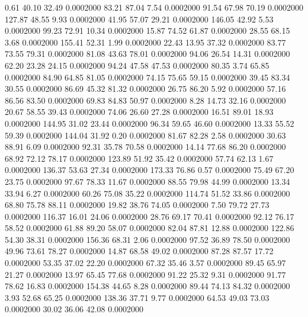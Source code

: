    0.61   40.10   32.49   0.0002000
  83.21   87.04    7.54   0.0002000
  91.54   67.98   70.19   0.0002000
 127.87   48.55    9.93   0.0002000
  41.95   57.07   29.21   0.0002000
 146.05   42.92    5.53   0.0002000
  99.23   72.91   10.34   0.0002000
  15.87   74.52   61.87   0.0002000
  28.55   68.15    3.68   0.0002000
 155.41   52.31    1.99   0.0002000
  22.43   13.95   37.32   0.0002000
  83.77   73.55   79.31   0.0002000
  81.08   43.63   78.01   0.0002000
  94.06   26.54   14.31   0.0002000
  62.20   23.28   24.15   0.0002000
  94.24   47.58   47.53   0.0002000
  80.35    3.74   65.85   0.0002000
  84.90   64.85   81.05   0.0002000
  74.15   75.65   59.15   0.0002000
  39.45   83.34   30.55   0.0002000
  86.69   45.32   81.32   0.0002000
  26.75   86.20    5.92   0.0002000
  57.16   86.56   83.50   0.0002000
  69.83   84.83   50.97   0.0002000
   8.28   14.73   32.16   0.0002000
  20.67   58.55   39.43   0.0002000
  74.06   26.60   27.28   0.0002000
  16.51   89.01   18.93   0.0002000
 144.95   31.02   23.44   0.0002000
  96.34   59.65   46.60   0.0002000
  13.33   55.52   59.39   0.0002000
 144.04   31.92    0.20   0.0002000
  81.67   82.28    2.58   0.0002000
  30.63   88.91    6.09   0.0002000
  92.31   35.78   70.58   0.0002000
  14.14   77.68   86.20   0.0002000
  68.92   72.12   78.17   0.0002000
 123.89   51.92   35.42   0.0002000
  57.74   62.13    1.67   0.0002000
 136.37   53.63   27.34   0.0002000
 173.33   76.86    0.57   0.0002000
  75.49   67.20   23.75   0.0002000
  97.67   78.33   11.67   0.0002000
  88.55   79.98   44.99   0.0002000
  13.34   33.94    6.27   0.0002000
  60.26   75.08   35.22   0.0002000
 114.74   51.52   33.86   0.0002000
  68.80   75.78   88.11   0.0002000
  19.82   38.76   74.05   0.0002000
   7.50   79.72   27.73   0.0002000
 116.37   16.01   24.06   0.0002000
  28.76   69.17   70.41   0.0002000
  92.12   76.17   58.52   0.0002000
  61.88   89.20   58.07   0.0002000
  82.04   87.81   12.88   0.0002000
 122.86   54.30   38.31   0.0002000
 156.36   68.31    2.06   0.0002000
  97.52   36.89   78.50   0.0002000
  49.96   73.61   78.27   0.0002000
  14.87   68.58   49.02   0.0002000
  87.28   87.57   17.72   0.0002000
  53.35   37.02   22.20   0.0002000
  67.32   35.46    3.57   0.0002000
  89.45   65.97   21.27   0.0002000
  13.97   65.45   77.68   0.0002000
  91.22   25.32    9.31   0.0002000
  91.77   78.62   16.83   0.0002000
 154.38   44.65    8.28   0.0002000
  89.44   74.13   84.32   0.0002000
   3.93   52.68   65.25   0.0002000
 138.36   37.71    9.77   0.0002000
  64.53   49.03   73.03   0.0002000
  30.02   36.06   42.08   0.0002000
